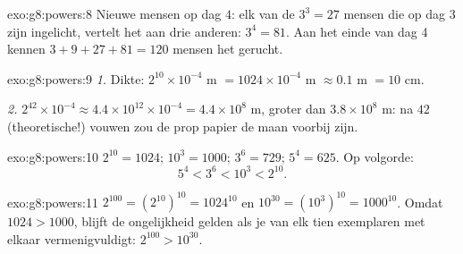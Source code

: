 \begin{solution}{exo:g8:powers:8}
Nieuwe mensen op dag $4$: elk van de $3^3 = 27$ mensen die op dag 3 zijn ingelicht,
vertelt het aan drie anderen: $3^4 = 81$. Aan het einde van dag 4 kennen
$3 + 9 + 27 + 81 = 120$ mensen het gerucht.
\end{solution}

\begin{solution}{exo:g8:powers:9}
\emph{1.} Dikte: $2^{10} \times 10^{-4}$ m $= 1024 \times 10^{-4}$ m $\approx 0.1$ m
$= 10$ cm.

\emph{2.} $2^{42} \times 10^{-4} \approx 4.4 \times 10^{12} \times 10^{-4} =
4.4 \times 10^8$ m, groter dan $3.8 \times 10^8$ m: na $42$ (theoretische!) vouwen zou
de prop papier de maan voorbij zijn.
\end{solution}

\begin{solution}{exo:g8:powers:10}
$2^{10} = 1024$; $10^3 = 1000$; $3^6 = 729$; $5^4 = 625$. Op volgorde:
\[
5^4 < 3^6 < 10^3 < 2^{10} .
\]
\end{solution}

\begin{solution}{exo:g8:powers:11}
$2^{100} = \left(2^{10}\right)^{10} = 1024^{10}$ en
$10^{30} = \left(10^3\right)^{10} = 1000^{10}$. Omdat $1024 > 1000$, blijft de
ongelijkheid gelden als je van elk tien exemplaren met elkaar vermenigvuldigt:
$2^{100} > 10^{30}$.
\end{solution}

